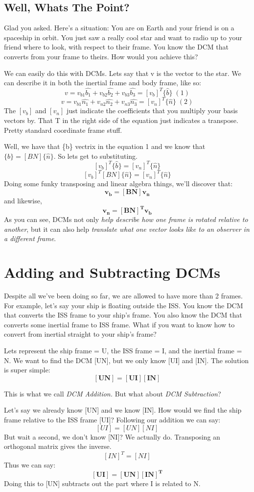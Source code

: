 \documentclass[a4paper,14pt]{extreport}
\newcommand{\bv}[1]{\hat{b_{#1}}}
\newcommand{\nv}[1]{\hat{n_{#1}}}
\begin{document}
\subsection{Well, Whats The Point?}
Glad you asked. Here's a situation: You are on Earth and your friend is on a spaceship in orbit. You just saw a really cool star and want to radio up to your friend where to look, with respect to their frame. You know the DCM that converts from your frame to theirs. How would you achieve this?

We can easily do this with DCMs. Lets say that v is the vector to the star. We can describe it in both the inertial frame and body frame, like so:
\[v = v_{b1}\bv{1}+v_{b2}\bv{2}+v_{b3}\bv{3}=[v_b]^T\{\hat{b}\}\;(1)\]
\[v = v_{b1}\nv{1}+v_{n2}\nv{2}+v_{n3}\nv{3}=[v_n]^T\{\hat{n}\}\;(2)\]
The $[v_b]$ and $[v_n]$ just indicate the coefficients that you multiply your basis vectors by. That T in the right side of the equation just indicates a transpose. Pretty standard coordinate frame stuff. 

Well, we have that \{b\} vectrix in the equation 1 and we know that $\{\hat{b}\} = [BN]\{\hat{n}\}$. So lets get to substituting.
\[[v_b]^T\{\hat{b}\} = [v_n]^T\{\hat{n}\}\]
\[[v_b]^T[BN]\{\hat{n}\} = [v_n]^T\{\hat{n}\}\]
Doing some funky transposing and linear algebra things, we'll discover that:
\[\bm{v_b = [BN]v_n}\]
and likewise,
\[\bm{v_n = [BN]^Tv_b}\]
As you can see, DCMs not only \emph{help describe how one frame is rotated relative to another}, but it can also help \emph{translate what one vector looks like to an observer in a different frame}.
\section{Adding and Subtracting DCMs}
Despite all we've been doing so far, we are allowed to have more than 2 frames. For example, let's say your ship is floating outside the ISS. You know the DCM that converts the ISS frame to your ship's frame. You also know the DCM that converts some inertial frame to ISS frame. What if you want to know how to convert from inertial straight to your ship's frame? 

Lets represent the ship frame = U, the ISS frame = I, and the inertial frame = N. We want to find the DCM [UN], but we only know [UI] and [IN]. The solution is super simple:
\[\bm{[UN] = [UI][IN]}\]

This is what we call \emph{DCM Addition.} But what about \emph{DCM Subtraction}?

Let's say we already know [UN] and we know [IN]. How would we find the ship frame relative to the ISS frame [UI]? Following our addition we can say:
\[[UI] = [UN][NI]\]
But wait a second, we don't know [NI]? We actually do. Transposing an orthogonal matrix gives the inverse.
\[[IN]^T = [NI]\]
Thus we can say:
\[\bm{[UI] = [UN][IN]^T}\]
Doing this to [UN] subtracts out the part where I is related to N.
\end{document}
